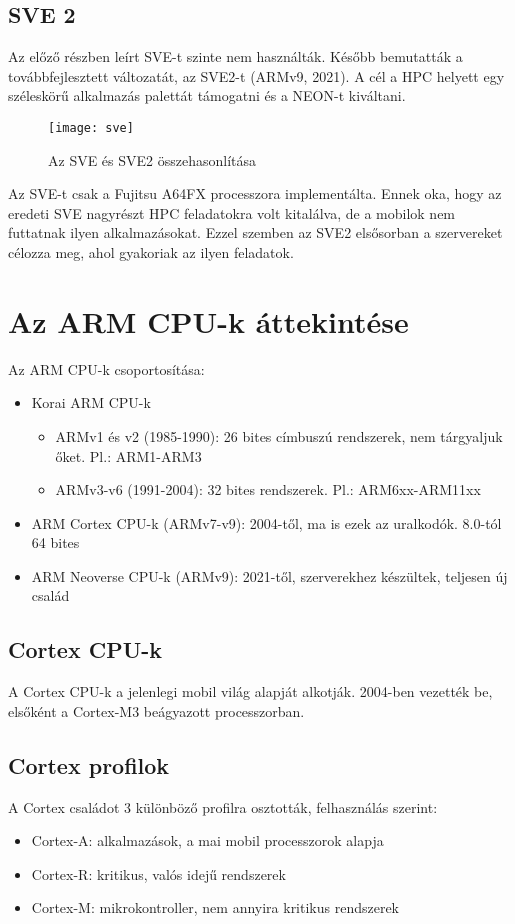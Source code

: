 \subsection{SVE 2}
Az előző részben leírt SVE-t szinte nem használták.
Később bemutatták a továbbfejlesztett változatát, az SVE2-t (ARMv9, 2021).
A cél a HPC helyett egy széleskörű alkalmazás palettát támogatni és a NEON-t kiváltani.
\begin{figure}[H]
    \texttt{[image: sve]}
    \centering
    \caption{Az SVE és SVE2 összehasonlítása}
    \label{fig:sve}
\end{figure}
Az SVE-t csak a Fujitsu A64FX processzora implementálta.
Ennek oka, hogy az eredeti SVE nagyrészt HPC feladatokra volt kitalálva, de a mobilok nem futtatnak ilyen alkalmazásokat.
Ezzel szemben az SVE2 elsősorban a szervereket célozza meg, ahol gyakoriak az ilyen feladatok.

\section{Az ARM CPU-k áttekintése}
Az ARM CPU-k csoportosítása:
\begin{itemize}
    \item Korai ARM CPU-k
    \begin{itemize}
        \item ARMv1 és v2 (1985-1990): 26 bites címbuszú rendszerek, nem tárgyaljuk őket. Pl.: ARM1-ARM3
        \item ARMv3-v6 (1991-2004): 32 bites rendszerek. Pl.: ARM6xx-ARM11xx
    \end{itemize}
    \item ARM Cortex CPU-k (ARMv7-v9): 2004-től, ma is ezek az uralkodók. 8.0-tól 64 bites
    \item ARM Neoverse CPU-k (ARMv9): 2021-től, szerverekhez készültek, teljesen új család
\end{itemize}

\subsection{Cortex CPU-k}
A Cortex CPU-k a jelenlegi mobil világ alapját alkotják.
2004-ben vezették be, elsőként a Cortex-M3 beágyazott processzorban.

\subsection{Cortex profilok}
A Cortex családot 3 különböző profilra osztották, felhasználás szerint:
\begin{itemize}
    \item Cortex-A: alkalmazások, a mai mobil processzorok alapja
    \item Cortex-R: kritikus, valós idejű rendszerek
    \item Cortex-M: mikrokontroller, nem annyira kritikus rendszerek
\end{itemize}


